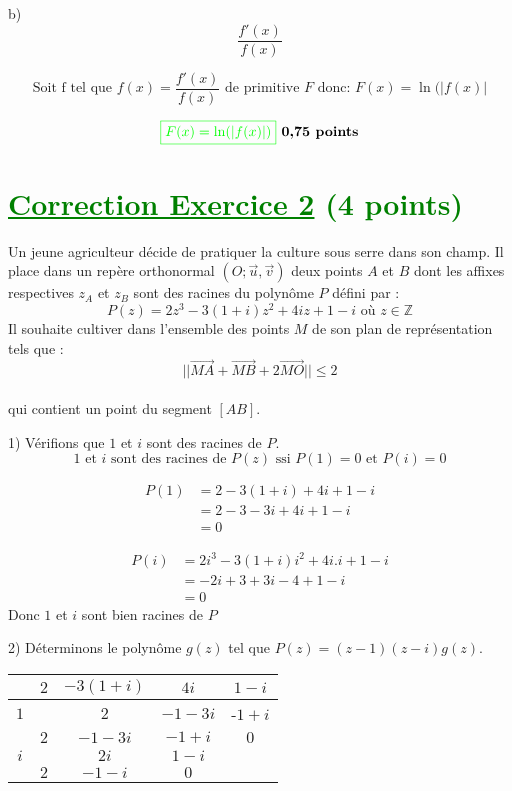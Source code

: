 \documentclass[12pt]{article}
\begin{document}
b)
\[
\frac{f'(x)}{f(x)}
\]

\[
\text{Soit f tel que }f(x)=\frac{f'(x)}{f(x)} \text{ de primitive } F \text{ donc: } F(x)=\ln(|f(x)|
\]

\[
\textcolor{green}{\boxed{ F(x)=\ln(|f(x)|) }} \textbf{ 0,75 points}
\]
\section*{\textcolor{green}{\underline{Correction Exercice 2} (4 points) }}
Un jeune agriculteur décide de pratiquer la culture sous serre dans son champ. Il place dans un repère orthonormal \( (O; \vec{u}, \vec{v}) \) deux points \( A \) et \( B \) dont les affixes respectives \( z_A \) et \( z_B \) sont des racines du polynôme \( P \) défini par :
\[
P(z) = 2z^3 - 3(1+i)z^2 + 4iz + 1 - i \text{ où } z\in\mathbb{Z}
\]
Il souhaite cultiver dans l'ensemble des points \( M \) de son plan de représentation tels que :
\[
||\overrightarrow{MA} + \overrightarrow{MB} + 2\overrightarrow{MO}|| \leq 2
\]\\
qui contient un point du segment \( [AB] \).

1) Vérifions que \(1\) et \(i\) sont des racines de \(P\). \\
\[
\text{1 et $i$ sont des racines de $P(z)$ ssi  }P(1) = 0 \text{ et } P(i) = 0
\]

\begin{align*}
P(1) &= 2 - 3(1+i) + 4i + 1 - i\\
		&= 2 - 3-3i + 4i + 1 - i\\
		&=0
\end{align*}

\begin{align*}
P(i) &=2i^3 - 3(1+i)i^2 + 4i.i + 1 - i\\
		&=-2i + 3+3i - 4 + 1 - i\\
		&=0
\end{align*}
Donc \(1\) et \(i\) sont bien racines de $P$

2) Déterminons le polynôme \( g(z) \) tel que \( P(z) = (z-1)(z-i)g(z) \). \\

\begin{tabular}{|c|c|c|c|c|}
\hline
&$2$ & $-3(1+i)$ & $4i$ & $1-i$\\
\hline
$1$&&$2$&$-1-3i$&-$1+i$\\
\hline
&$2$&$-1-3i$&$-1+i$&$0$\\
\hline
$i$&&$2i$&$1-i$&\\
\hline
&$2$&$-1-i$&$0$&\\
\hline
\end{tabular}
\end{document}

